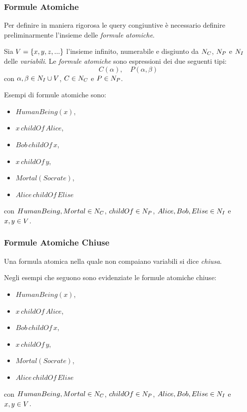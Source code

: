 \documentclass[8pt]{beamer}
\begin{document}
\begin{frame}
\frametitle{Formule Atomiche}

Per definire in maniera rigorosa le query congiuntive \`e necessario
definire preliminarmente l'insieme delle \emph{formule atomiche}. 
\vspace{\baselineskip}

Sia $V = \{x, y, z, ... \}$ l'insieme infinito, numerabile 
e disgiunto da $N_C$, $N_P$ e $N_I$ delle \emph{variabili}.
Le \emph{formule atomiche} sono espressioni dei due seguenti tipi:
\[
 C(\alpha), \quad P(\alpha, \beta)
\]
con $\alpha, \beta \in N_I \cup V$, $C \in N_C$ e $P \in N_P$.
\vspace{\baselineskip}

Esempi di formule atomiche sono:
\begin{itemize}
 \item $HumanBeing(x)$,
 \item $x\,childOf\,Alice$,
 \item $Bob\,childOf\,x$,
 \item $x\,childOf\,y$,
 \item $Mortal(Socrate)$,
 \item $Alice\,childOf\,Elise$
\end{itemize}
con $HumanBeing, Mortal \in N_C$, $childOf \in N_P$, 
$Alice, Bob, Elise \in N_I$ e $x, y \in V$.
\end{frame}

\begin{frame}
\frametitle{Formule Atomiche Chiuse}
Una formula atomica nella quale non compaiano variabili si dice \emph{chiusa}.
\vspace{\baselineskip}

Negli esempi che seguono sono evidenziate le formule atomiche chiuse:
\begin{itemize}
 \item $HumanBeing(x)$,
 \item $x\,childOf\,Alice$,
 \item $Bob\,childOf\,x$,
 \item $x\,childOf\,y$,
 \item $Mortal(Socrate)$,
 \item $Alice\,childOf\,Elise$
\end{itemize}
con $HumanBeing, Mortal \in N_C$, $childOf \in N_P$, 
$Alice, Bob, Elise \in N_I$ e $x, y \in V$.
\vspace{\baselineskip}

\phantom{Le asserzioni presenti nelle ontologie sono formule atomiche chiuse.}
\end{frame}
\end{document}
